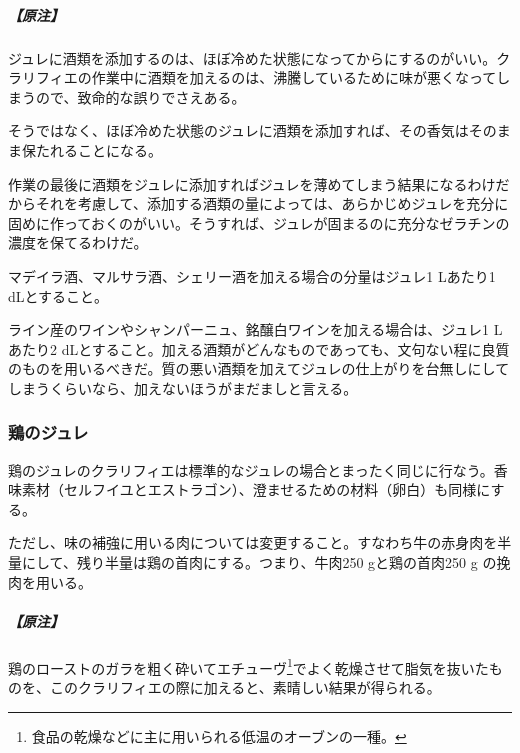 \begin{recette}
\hypertarget{nota-gelees-grasses-ordinaires}{%
\subparagraph{【原注】}\label{nota-gelees-grasses-ordinaires}}

ジュレに酒類を添加するのは、ほぼ冷めた状態になってからにするのがいい。クラリフィエの作業中に酒類を加えるのは、沸騰しているために味が悪くなってしまうので、致命的な誤りでさえある。

そうではなく、ほぼ冷めた状態のジュレに酒類を添加すれば、その香気はそのまま保たれることになる。

作業の最後に酒類をジュレに添加すればジュレを薄めてしまう結果になるわけだからそれを考慮して、添加する酒類の量によっては、あらかじめジュレを充分に固めに作っておくのがいい。そうすれば、ジュレが固まるのに充分なゼラチンの濃度を保てるわけだ。

マデイラ酒、マルサラ酒、シェリー酒を加える場合の分量はジュレ1 Lあたり1
dLとすること。

ライン産のワインやシャンパーニュ、銘醸白ワインを加える場合は、ジュレ1
Lあたり2
dLとすること。加える酒類がどんなものであっても、文句ない程に良質のものを用いるべきだ。質の悪い酒類を加えてジュレの仕上がりを台無しにしてしまうくらいなら、加えないほうがまだましと言える。

\atoaki{}

\hypertarget{gelee-de-volaille}{%
\subsubsection{鶏のジュレ}\label{gelee-de-volaille}}



鶏のジュレのクラリフィエは標準的なジュレの場合とまったく同じに行なう。香味素材（セルフイユとエストラゴン）、澄ませるための材料（卵白）も同様にする。

ただし、味の補強に用いる肉については変更すること。すなわち牛の赤身肉を半量にして、残り半量は鶏の首肉にする。つまり、牛肉250
gと鶏の首肉250 g の挽肉を用いる。

\hypertarget{nota-gelee-de-volaile}{%
\subparagraph{【原注】}\label{nota-gelee-de-volaile}}

鶏のローストのガラを粗く砕いてエチューヴ\footnote{食品の乾燥などに主に用いられる低温のオーブンの一種。}でよく乾燥させて脂気を抜いたものを、このクラリフィエの際に加えると、素晴しい結果が得られる。


\end{recette}
